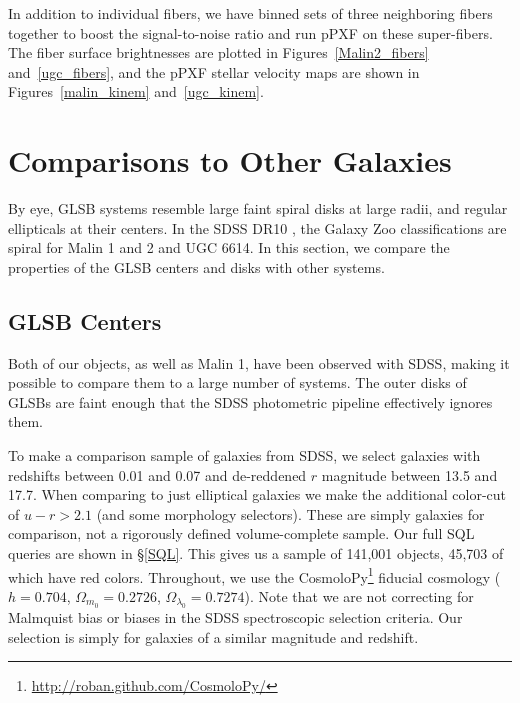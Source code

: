 \documentclass{emulateapj}
\def\arcsec{$^{\prime\prime}$}
\begin{document}
In addition to individual fibers, we have binned sets of three neighboring fibers together to boost the signal-to-noise ratio and run pPXF on these super-fibers. The fiber surface brightnesses are plotted in Figures~\ref{Malin2_fibers} and~\ref{ugc_fibers}, and the pPXF stellar velocity maps are shown in Figures~\ref{malin_kinem} and~\ref{ugc_kinem}.






\section{Comparisons to Other Galaxies}

By eye, GLSB systems resemble large faint spiral disks at large radii, and regular ellipticals at their centers.  In the SDSS DR10 \citep{Ahn14}, the Galaxy Zoo classifications \citep{Willett13} are spiral for Malin 1 and 2 and UGC 6614.  In this section, we compare the properties of the GLSB centers and disks with other systems.  

\subsection{GLSB Centers}\label{sec:centers}

Both of our objects, as well as Malin 1, have been observed with SDSS, making it possible to compare them to a large number of systems.  The outer disks of GLSBs are faint enough that the SDSS photometric pipeline effectively ignores them.  

To make a comparison sample of galaxies from SDSS, we select galaxies with redshifts between 0.01 and 0.07 and de-reddened $r$ magnitude between 13.5 and 17.7.  When comparing to just elliptical galaxies we make the additional color-cut of $u-r > 2.1$ (and some morphology selectors).  These are simply galaxies for comparison, not a rigorously defined volume-complete sample.  Our full SQL queries are shown in \S\ref{SQL}.  This gives us a sample of 141,001 objects, 45,703 of which have red colors.  Throughout, we use the CosmoloPy\footnote{\url{http://roban.github.com/CosmoloPy/}} fiducial cosmology ($h=0.704$, $\Omega_{m_0}=0.2726$, $\Omega_{\lambda_0}=0.7274$).  Note that we are not correcting for Malmquist bias or biases in the SDSS spectroscopic selection criteria.  Our selection is simply for galaxies of a similar magnitude and redshift.  
\end{document}
